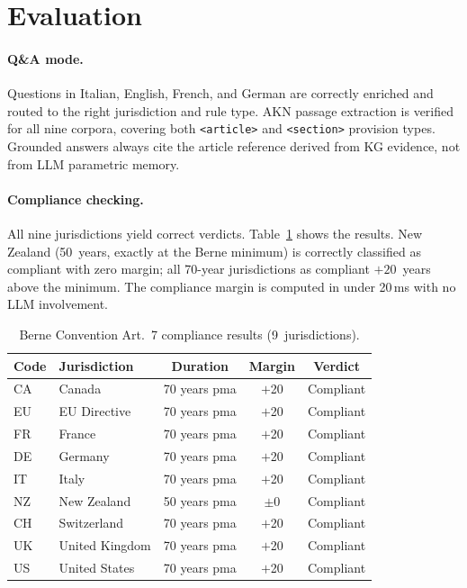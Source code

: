 \documentclass[12pt,a4paper]{article}
\begin{document}
\section{Evaluation}

\paragraph{Q\&A mode.}
Questions in Italian, English, French, and German are correctly enriched
and routed to the right jurisdiction and rule type. AKN passage extraction
is verified for all nine corpora, covering both \texttt{<article>} and
\texttt{<section>} provision types. Grounded answers always cite the
article reference derived from KG evidence, not from LLM parametric
memory.

\paragraph{Compliance checking.}
All nine jurisdictions yield correct verdicts. Table~\ref{tab:compliance}
shows the results. New Zealand (50~years, exactly at the Berne minimum) is
correctly classified as compliant with zero margin; all 70-year
jurisdictions as compliant $+20$~years above the minimum. The compliance
margin is computed in under 20\,ms with no LLM involvement.

\begin{table}[H]
\centering
\caption{Berne Convention Art.~7 compliance results (9~jurisdictions).}
\label{tab:compliance}
\begin{tabularx}{\textwidth}{lXccc}
\toprule
\textbf{Code} & \textbf{Jurisdiction} &
\textbf{Duration} & \textbf{Margin} & \textbf{Verdict} \\
\midrule
CA & Canada           & 70 years pma & $+$20 & \textcolor{green!60!black}{Compliant} \\
EU & EU Directive     & 70 years pma & $+$20 & \textcolor{green!60!black}{Compliant} \\
FR & France           & 70 years pma & $+$20 & \textcolor{green!60!black}{Compliant} \\
DE & Germany          & 70 years pma & $+$20 & \textcolor{green!60!black}{Compliant} \\
IT & Italy            & 70 years pma & $+$20 & \textcolor{green!60!black}{Compliant} \\
NZ & New Zealand      & 50 years pma & $\pm$0 & \textcolor{green!60!black}{Compliant} \\
CH & Switzerland      & 70 years pma & $+$20 & \textcolor{green!60!black}{Compliant} \\
UK & United Kingdom   & 70 years pma & $+$20 & \textcolor{green!60!black}{Compliant} \\
US & United States    & 70 years pma & $+$20 & \textcolor{green!60!black}{Compliant} \\
\bottomrule
\end{tabularx}
\end{table}
\end{document}
